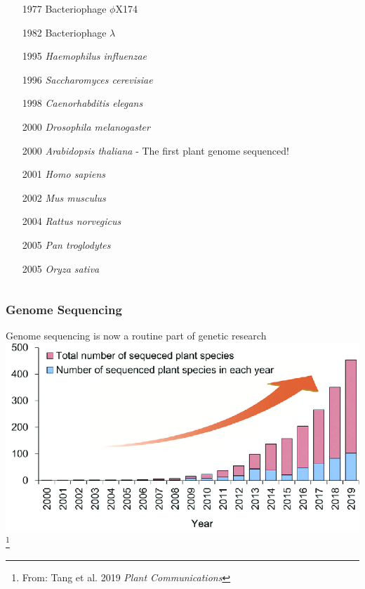 \documentclass{beamer}
\newcommand\blfootnote[1]{%
	\begingroup
	\renewcommand\thefootnote{}\footnote{#1}%
	\addtocounter{footnote}{-1}%
	\endgroup
}
\begin{document}
\begin{frame}
\begin{columns}
\begin{column}{0.9\textwidth}
			\begin{itemize}
\item[1977] Bacteriophage $\phi$X174
\item[1982] Bacteriophage $\lambda$
\item[1995] \textit{Haemophilus influenzae}
\item[1996] \textit{Saccharomyces cerevisiae}
\item[1998] \textit{Caenorhabditis elegans}
\item[2000] \textit{Drosophila melanogaster}
\item[2000] \textit{Arabidopsis thaliana} -\small{ The first plant genome sequenced! } \normalsize
\item[2001] \textit{Homo sapiens}
\item[2002] \textit{Mus musculus}
\item[2004] \textit{Rattus norvegicus}
\item[2005] \textit{Pan troglodytes}
\item[2005] \textit{Oryza sativa}
				
			\end{itemize}
		\end{column}
	\end{columns}
\end{frame}



\begin{frame}
	\frametitle{Genome Sequencing}
	Genome sequencing is now a routine part of genetic research\\
	\vspace{10pt}
	\centering \includegraphics[keepaspectratio, width  =\textwidth]{img/plantGenomes} 
	\blfootnote{From: Tang et al. 2019 \textit{Plant Communications}}
\end{frame}
\end{document}
